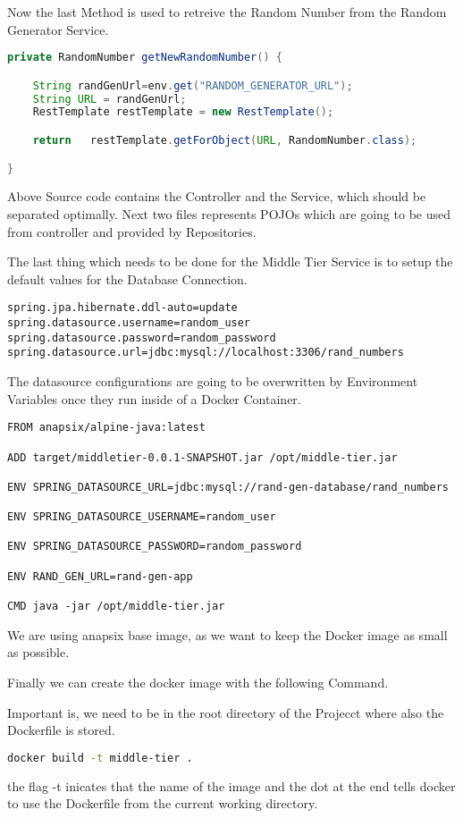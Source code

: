 Now the last Method is used to retreive the Random Number from the Random Generator Service.
\begin{lstlisting}[language=Java]
private RandomNumber getNewRandomNumber() {

    String randGenUrl=env.get("RANDOM_GENERATOR_URL");
    String URL = randGenUrl;
    RestTemplate restTemplate = new RestTemplate();

    return   restTemplate.getForObject(URL, RandomNumber.class);

}
\end{lstlisting}
Above Source code contains the Controller and the Service, which should be separated optimally.
Next two files represents POJOs which are going to be used from controller and provided by Repositories.

The last thing which needs to be done for the Middle Tier Service is to setup the default values for the Database Connection.
\begin{lstlisting}
spring.jpa.hibernate.ddl-auto=update
spring.datasource.username=random_user
spring.datasource.password=random_password
spring.datasource.url=jdbc:mysql://localhost:3306/rand_numbers
\end{lstlisting}
The datasource configurations are going to be overwritten by Environment Variables once they run inside of a Docker Container.

\begin{lstlisting}
FROM anapsix/alpine-java:latest

ADD target/middletier-0.0.1-SNAPSHOT.jar /opt/middle-tier.jar

ENV SPRING_DATASOURCE_URL=jdbc:mysql://rand-gen-database/rand_numbers

ENV SPRING_DATASOURCE_USERNAME=random_user

ENV SPRING_DATASOURCE_PASSWORD=random_password

ENV RAND_GEN_URL=rand-gen-app

CMD java -jar /opt/middle-tier.jar

\end{lstlisting}
We are using anapsix base image, as we want to keep the Docker image as small as possible.

Finally we can create the docker image with the following Command.

Important is, we need to be in the root directory of the Projecct where also the Dockerfile is stored.
\begin{lstlisting}[language=Bash]
docker build -t middle-tier .
\end{lstlisting}
the flag -t inicates that the name of the image and the dot at the end tells docker to use the Dockerfile from the current working directory.